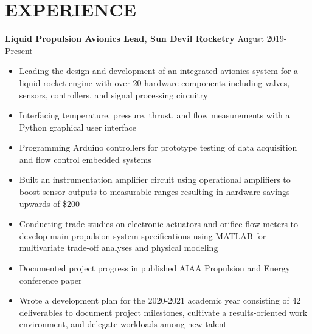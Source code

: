 \documentclass{article}
\begin{document}
\section{EXPERIENCE}
\textbf{Liquid Propulsion Avionics Lead, Sun Devil Rocketry}
\hfill
\vspace{0.5em}
August 2019-Present
\begin{itemize}
	\item{Leading the design and development of an integrated avionics system for a liquid rocket engine with over 20 hardware components including valves, sensors, controllers, and signal processing circuitry}
	\item{Interfacing temperature, pressure, thrust, and flow measurements with a Python graphical user interface}
	\item{Programming Arduino controllers for prototype testing of data acquisition and flow control embedded systems}
	\item{Built an instrumentation amplifier circuit using operational amplifiers to boost sensor outputs to measurable ranges resulting in hardware savings upwards of \$200}
	\item{Conducting trade studies on electronic actuators and orifice flow meters to develop main propulsion system specifications using MATLAB for multivariate trade-off analyses and physical modeling}
	\item{Documented project progress in published AIAA Propulsion and Energy conference paper}
	\item{Wrote a development plan for the 2020-2021 academic year consisting of 42 deliverables to document project milestones, cultivate a results-oriented work environment, and delegate workloads among new talent}	
\end{itemize}
\end{document}
